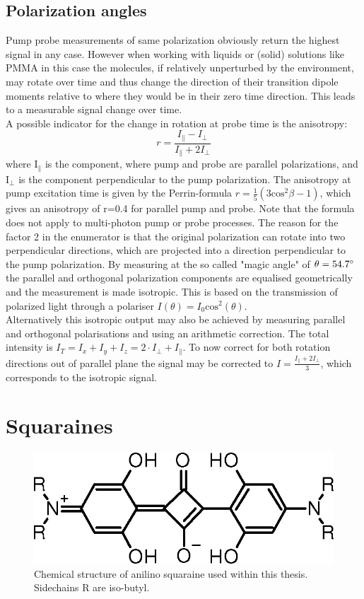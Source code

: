 \documentclass[twoside,openright]{scrreprt}
\begin{document}
\subsection{Polarization angles}\label{sec:PolAngles}
Pump probe measurements of same polarization obviously return the highest signal in any case. However when working with liquids or (solid) solutions like PMMA in this case the molecules, if relatively unperturbed by the environment, may rotate over time and thus change the direction of their transition dipole moments relative to where they would be in their zero time direction. This leads to a measurable signal change over time.\\
A possible indicator for the change in rotation at probe time is the anisotropy:\cite[chapter 10]{Lakowicz2008}
\begin{equation*}
r = \frac{I_{\parallel}-I_{\perp}}{I_{\parallel}+2I_{\perp}}
\end{equation*}
where $\mathrm{I_\parallel}$ is the component, where pump and probe are parallel polarizations, and $\mathrm{I_\perp}$ is the component perpendicular to the pump polarization. The anisotropy at pump excitation time is given by the Perrin-formula $r = \frac{1}{5}\left(3\mathrm{cos^2}\beta-1\right)$, which gives an anisotropy of r=0.4 for parallel pump and probe. Note that the formula does not apply to multi-photon pump or probe processes. The reason for the factor 2 in the enumerator is that the original polarization can rotate into two perpendicular directions, which are projected into a direction perpendicular to the pump polarization. By measuring at the so called "magic angle" of $\theta = 54.7 \degree$ the parallel and orthogonal polarization components are equalised geometrically and the measurement is made isotropic. This is based on the transmission of polarized light through a polariser $I(\theta) = I_0 \mathrm{cos}^2(\theta)$. \cite[chapter 10]{Lakowicz2008}\cite{Schalk2010}\\
Alternatively this isotropic output may also be achieved by measuring parallel and orthogonal polarisations and using an arithmetic correction. The total intensity is $I_T = I_x+I_y+I_z = 2\cdot I_\perp + I_\parallel$. To now correct for both rotation directions out of parallel plane the signal may be corrected to $I = \frac{I_\parallel + 2I_\perp}{3}$, which corresponds to the isotropic signal.\cite{Zheng2020}



\section{Squaraines}
\begin{figure}[hbtp]
\centering
\includegraphics[width=0.6\linewidth]{images/nAlinoSquaraine.jpeg}
\caption{Chemical structure of anilino squaraine used within this thesis. Sidechains R are iso-butyl.\label{fig:chemStructureSQIB}}
\end{figure}
\end{document}
